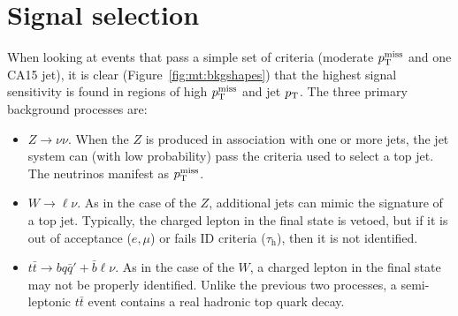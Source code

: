 \clearpage

\section{Signal selection}
\label{sec:mt:sel}

When looking at events that pass a simple set of criteria (moderate $p_\mathrm{T}^\mathrm{miss}$ and one CA15 jet), it is clear (Figure~\ref{fig:mt:bkgshapes}) that the highest signal sensitivity is found in regions of high $p_\mathrm{T}^\mathrm{miss}$ and jet $p_\mathrm{T}$.
The three primary background processes are:
\begin{itemize}
    \item $Z\rightarrow\nu\nu$. When the $Z$ is produced in association with one or more jets, the jet system can (with low probability) pass the criteria used to select a top jet. The neutrinos manifest as $p_\mathrm{T}^\mathrm{miss}$.
    \item $W\rightarrow\ell\nu$. As in the case of the $Z$, additional jets can mimic the signature of a top jet. Typically, the charged lepton in the final state is vetoed, but if it is out of acceptance ($e,\mu$) or fails ID criteria ($\tau_\mathrm{h}$), then it is not identified. 
    \item $t\bar{t} \rightarrow bq\bar{q}' + \bar{b}\ell\nu$. As in the case of the $W$, a charged lepton in the final state may not be properly identified. Unlike the previous two processes, a semi-leptonic $t\bar{t}$ event contains a real hadronic top quark decay. 
\end{itemize}

